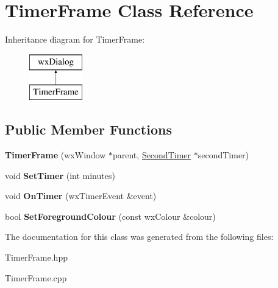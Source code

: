 \hypertarget{class_timer_frame}{}\section{Timer\+Frame Class Reference}
\label{class_timer_frame}
Inheritance diagram for Timer\+Frame\+:\begin{figure}[H]
\begin{center}
\leavevmode
\includegraphics[height=2.000000cm]{class_timer_frame}
\end{center}
\end{figure}
\subsection*{Public Member Functions}
\begin{DoxyCompactItemize}
\item 
\mbox{\label{class_timer_frame_a4522ee225fbef6ff57b019d41ded9170}} 
{\bfseries Timer\+Frame} (wx\+Window $\ast$parent, \hyperlink{class_second_timer}{Second\+Timer} $\ast$second\+Timer)
\item 
\mbox{\label{class_timer_frame_a8f10581ed95c40a528d4fab4bacab3a4}} 
void {\bfseries Set\+Timer} (int minutes)
\item 
\mbox{\label{class_timer_frame_abc95018d0407ce1cd32b2cd5e4d1c9d9}} 
void {\bfseries On\+Timer} (wx\+Timer\+Event \&event)
\item 
\mbox{\label{class_timer_frame_a9060e690bf63991cf8c0a44e9fbd2adc}} 
bool {\bfseries Set\+Foreground\+Colour} (const wx\+Colour \&colour)
\end{DoxyCompactItemize}


The documentation for this class was generated from the following files\+:\begin{DoxyCompactItemize}
\item 
Timer\+Frame.\+hpp\item 
Timer\+Frame.\+cpp\end{DoxyCompactItemize}
